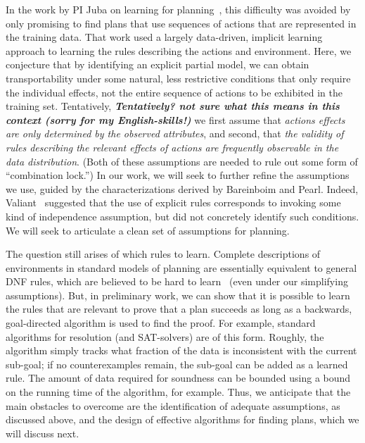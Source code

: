 \documentclass[12pt]{article}
\newcommand{\note}[1]{\textbf{\textit{#1}}}
\begin{document}
In the work by PI Juba on learning for planning~\cite{juba2016jmlr}, this difficulty was avoided by only promising to find plans that use sequences of actions that are represented in the training data. That work used a largely data-driven, implicit learning approach to learning the rules describing the actions and environment. Here, we conjecture that by identifying an explicit partial model, we can obtain transportability under some natural, less restrictive conditions that only require the individual effects, not the entire sequence of actions to be exhibited in the training set. Tentatively, \note{Tentatively? not sure what this means in this context (sorry for my English-skills!)} we first assume that {\em actions effects are only determined by the observed attributes}, and second, that {\em the validity of rules describing the relevant effects of actions are frequently observable in the data distribution}. (Both of these assumptions are needed to rule out some form of ``combination lock.'') In our work, we will seek to further refine the assumptions we use, guided by the characterizations derived by Bareinboim and Pearl. Indeed, Valiant~\cite{valiant2006knowledgeInfusion} suggested that the use of explicit rules corresponds to invoking some kind of independence assumption, but did not concretely identify such conditions. We will seek to articulate a clean set of assumptions for planning.

The question still arises of which rules to learn. Complete descriptions of environments in standard models of planning are essentially equivalent to general DNF rules, which are believed to be hard to learn~\cite{daniely2016dnf} (even under our simplifying assumptions). But, in preliminary work, we can show that it is possible to learn the rules that are relevant to prove that a plan succeeds 
as long as a backwards, goal-directed algorithm is used to find the proof. For example, standard algorithms for resolution (and SAT-solvers) are of this form. Roughly, the algorithm simply tracks what fraction of the data is inconsistent with the current sub-goal; if no counterexamples remain, the sub-goal can be added as a learned rule. The amount of data required for soundness can be bounded using a bound on the running time of the algorithm, for example. Thus, we anticipate that the main obstacles to overcome are the identification of adequate assumptions, as discussed above, and the design of effective algorithms for finding plans, which we will discuss next.
\end{document}
